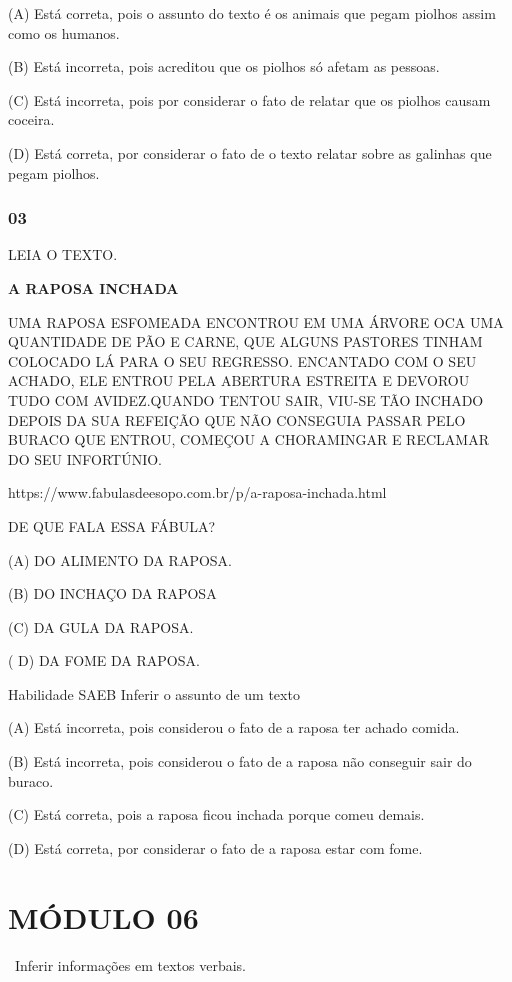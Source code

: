 (A) Está correta, pois o assunto do texto é os animais que pegam piolhos
assim como os humanos.

(B) Está incorreta, pois acreditou que os piolhos só afetam as pessoas.

(C) Está incorreta, pois por considerar o fato de relatar que os piolhos
causam coceira.

(D) Está correta, por considerar o fato de o texto relatar sobre as
galinhas que pegam piolhos.

\subsubsection{03 }\label{section-67}

LEIA O TEXTO.

\textbf{A RAPOSA INCHADA}

UMA RAPOSA ESFOMEADA ENCONTROU EM UMA ÁRVORE OCA UMA QUANTIDADE DE PÃO E
CARNE, QUE ALGUNS PASTORES TINHAM COLOCADO LÁ PARA O SEU REGRESSO.
ENCANTADO COM O SEU ACHADO, ELE ENTROU PELA ABERTURA ESTREITA E DEVOROU
TUDO COM AVIDEZ.QUANDO TENTOU SAIR, VIU-SE TÃO INCHADO DEPOIS DA SUA
REFEIÇÃO QUE NÃO CONSEGUIA PASSAR PELO BURACO QUE ENTROU, COMEÇOU A
CHORAMINGAR E RECLAMAR DO SEU INFORTÚNIO.

https://www.fabulasdeesopo.com.br/p/a-raposa-inchada.html

DE QUE FALA ESSA FÁBULA?

(A) DO ALIMENTO DA RAPOSA.

(B) DO INCHAÇO DA RAPOSA

(C) DA GULA DA RAPOSA.

( D) DA FOME DA RAPOSA.

Habilidade SAEB Inferir o assunto de um texto

(A) Está incorreta, pois considerou o fato de a raposa ter achado
comida.

(B) Está incorreta, pois considerou o fato de a raposa não conseguir
sair do buraco.

(C) Está correta, pois a raposa ficou inchada porque comeu demais.

(D) Está correta, por considerar o fato de a raposa estar com fome.

\section{MÓDULO 06}\label{muxf3dulo-06}

~Inferir informações em textos verbais.

